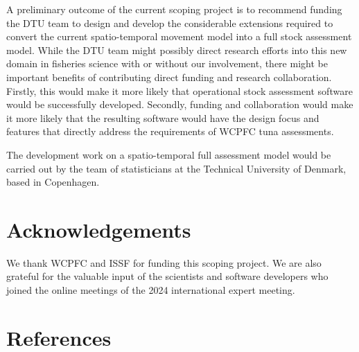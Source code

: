 \documentclass{SCreport}
\begin{document}
A preliminary outcome of the current scoping project is to recommend funding the
DTU team to design and develop the considerable extensions required to convert
the current spatio-temporal movement model into a full stock assessment model.
While the DTU team might possibly direct research efforts into this new domain
in fisheries science with or without our involvement, there might be important
benefits of contributing direct funding and research collaboration. Firstly,
this would make it more likely that operational stock assessment software would
be successfully developed. Secondly, funding and collaboration would make it
more likely that the resulting software would have the design focus and features
that directly address the requirements of WCPFC tuna assessments.

The development work on a spatio-temporal full assessment model would be carried
out by the team of statisticians at the Technical University of Denmark, based
in Copenhagen.

\section{Acknowledgements}

We thank WCPFC and ISSF for funding this scoping project. We are also grateful
for the valuable input of the scientists and software developers who joined the
online meetings of the 2024 international expert meeting.

\section{References}

\sloppy\setlength{}
\end{document}
